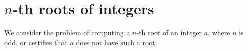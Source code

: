 \documentclass[11pt]{exam}
\theoremstyle{definition}
\begin{document}




  
\section{$n$-th roots of integers}

We consider the problem of computing a $n$-th root of an integer $a$, where $n$ is odd, or certifies that $a$ does not have such a root. 
\end{document}
